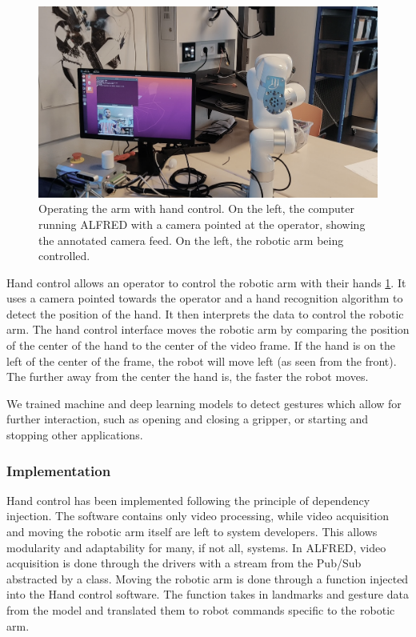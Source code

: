 \begin{figure}[h]
    \centering
    \includegraphics{images/hand_control_overview.png}
    \caption{Operating the arm with hand control. On the left, the computer running ALFRED with a camera pointed at the operator, showing the annotated camera feed. On the left, the robotic arm being controlled.}
    \label{fig:hand_control_overview}
\end{figure}

Hand control allows an operator to control the robotic arm with their hands \ref{fig:hand_control_overview}. It uses a camera pointed towards the operator and a hand recognition algorithm to detect the position of the hand. It then interprets the data to control the robotic arm. The hand control interface moves the robotic arm by comparing the position of the center of the hand to the center of the video frame. If the hand is on the left of the center of the frame, the robot will move left (as seen from the front). The further away from the center the hand is, the faster the robot moves.

We trained machine and deep learning models to detect gestures which allow for further interaction, such as opening and closing a gripper, or starting and stopping other applications.

\subsubsection{Implementation}

Hand control has been implemented following the principle of dependency injection. The software contains only video processing, while video acquisition and moving the robotic arm itself are left to system developers. This allows modularity and adaptability for many, if not all, systems. In ALFRED, video acquisition is done through the drivers with a stream from the Pub/Sub abstracted by a class. Moving the robotic arm is done through a function injected into the Hand control software. The function takes in landmarks and gesture data from the model and translated them to robot commands specific to the robotic arm.

